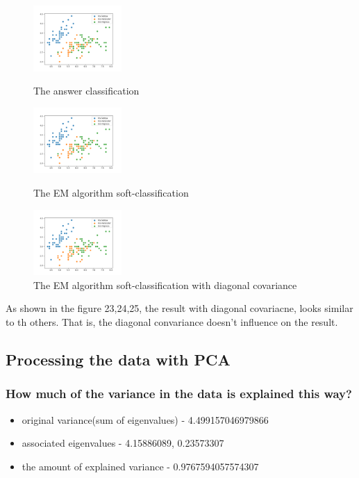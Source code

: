 \documentclass[a4paper]{article}
\begin{document}
	\begin{figure}[h]
		\begin{center}
			\includegraphics[width=0.3\textwidth]{4_answer.png}
			\caption{The answer classification}
			\includegraphics[width=0.3\textwidth]{4class.png}
			\caption{The EM algorithm soft-classification}
			\includegraphics[width=0.3\textwidth]{4_cov0.png}
			\caption{The EM algorithm soft-classification with diagonal covariance}
		\end{center}
	\end{figure}

	As shown in the figure 23,24,25, the result with diagonal covariacne, looks similar to th others. That is, the diagonal convariance doesn't influence on the result.
        \clearpage
	\subsection{Processing the data with PCA }
	\subsubsection{How much of the variance in the data is explained this way?}
        \begin{itemize}
          \item original variance(sum of eigenvalues) -  4.499157046979866
          \item associated eigenvalues - 4.15886089, 0.23573307
          \item the amount of explained variance - 0.9767594057574307
        \end{itemize}
\end{document}
